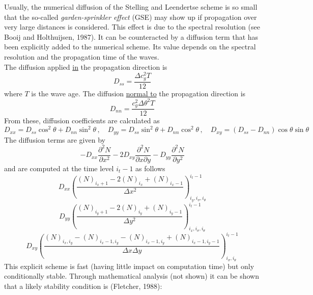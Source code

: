 \documentclass[12pt]{book}
\begin{document}
\noindent
Usually, the numerical diffusion of the Stelling and Leendertse scheme is so small that the so-called {\it garden-sprinkler effect} (GSE) may show up if propagation
over very large distances is considered. This effect is due to the spectral resolution (see Booij and Holthuijsen, 1987). It can be counteracted by a diffusion term
that has been explicitly added to the numerical scheme. Its value depends on the spectral resolution and the propagation time of the waves.
\\[2ex]
\noindent
The diffusion applied \underline{in} the propagation direction is
\begin{equation}
  D_{ss} = \frac{\Delta c_g^2T}{12}
\end{equation}
where $T$ is the wave age. The diffusion \underline{normal to} the propagation direction is
\begin{equation}
  D_{nn} = \frac{c_g^2 \Delta \theta^2 T}{12}
\end{equation}
From these, diffusion coefficients are calculated as
\begin{equation}
  D_{xx} = D_{ss} \cos^2\theta + D_{nn} \sin^2 \theta \,, \quad D_{yy} = D_{ss} \sin^2\theta + D_{nn} \cos^2 \theta \,, \quad
  D_{xy} = (D_{ss}-D_{nn}) \cos \theta \sin \theta
\end{equation}
The diffusion terms are given by
\begin{equation}
  -D_{xx}\frac{\partial^2 N}{\partial x^2}
  -2D_{xy}\frac{\partial^2 N}{\partial x \partial y}
  -D_{yy}\frac{\partial^2 N}{\partial y^2}
  \label{eq:gsediff}
\end{equation}
and are computed at the time level $i_t-1$ as follows
\begin{equation}
  D_{xx} \left( \frac{(N)_{i_x+1} - 2(N)_{i_x} + (N)_{i_x-1}}{\Delta x^2} \right)^{i_t-1}_{i_y, i_{\sigma}, i_{\theta}}
\end{equation}
\begin{equation}
  D_{yy} \left( \frac{(N)_{i_y+1} - 2(N)_{i_y} + (N)_{i_y-1}}{\Delta y^2} \right)^{i_t-1}_{i_x, i_{\sigma}, i_{\theta}}
\end{equation}
\begin{equation}
  D_{xy} \left( \frac{(N)_{i_x,i_y} - (N)_{i_x-1,i_y} - (N)_{i_x-1,i_y} + (N)_{i_x-1,i_y-1}}{\Delta x \Delta y} \right)^{i_t-1}_{i_{\sigma}, i_{\theta}}
\end{equation}
This explicit scheme is fast (having little impact on computation time) but only conditionally stable. Through mathematical analysis (not shown) it can be
shown that a likely stability condition is (Fletcher, 1988):
\end{document}
